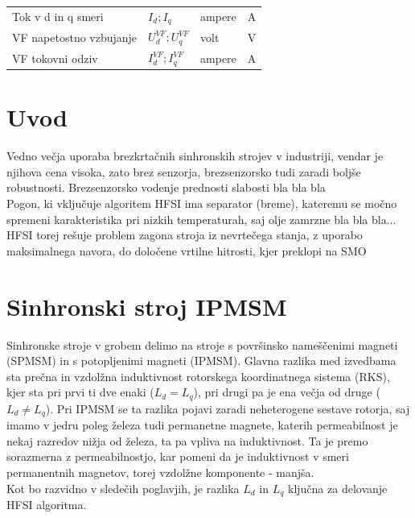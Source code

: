 \documentclass[a4paper,twoside,openright,12pt,slovene]{book}
\begin{document}
\begin{center}
\begin{tabular}{*{4}{l}}
        Tok v d in q smeri                                         & $I_{d}; I_{q}$                         & ampere               & A                      \\
        VF napetostno vzbujanje                                    & $U^{VF}_{d}; U^{VF}_{q}$               & volt                 & V                      \\
        VF tokovni odziv                                           & $I^{VF}_{d}; I^{VF}_{q}$               & ampere               & A                      \\
    \end{tabular}
\end{center}

\mainmatter

\chapter{Uvod} \label{uvod}

Vedno večja uporaba brezkrtačnih sinhronskih strojev v industriji, vendar je njihova cena visoka, zato brez senzorja, brezsenzorsko tudi zaradi boljše robustnosti. Brezsenzorsko vodenje prednosti slabosti bla bla bla \\
Pogon, ki vključuje algoritem HFSI ima separator (breme), kateremu se močno spremeni karakteristika pri nizkih temperaturah, saj olje zamrzne bla bla bla... \\
HFSI torej rešuje problem zagona stroja iz nevrtečega stanja, z uporabo maksimalnega navora, do določene vrtilne hitrosti, kjer preklopi na SMO


\chapter{Sinhronski stroj IPMSM} \label{sinhronskiStroj}

Sinhronske stroje v grobem delimo na stroje s površinsko nameščenimi magneti (SPMSM) in s potopljenimi magneti (IPMSM). Glavna razlika med izvedbama sta prečna in vzdolžna induktivnost rotorskega
koordinatnega sistema (RKS), kjer sta pri prvi ti dve enaki ($L_d = L_q$), pri drugi pa je ena večja od druge ($L_d \neq L_q$). Pri IPMSM se ta razlika pojavi zaradi neheterogene sestave rotorja, saj
imamo v jedru poleg železa tudi permanetne magnete, katerih permeabilnost je nekaj razredov nižja od železa, ta pa vpliva na induktivnost. Ta je premo sorazmerna z permeabilnostjo, kar pomeni da je
induktivnost v smeri permanentnih magnetov, torej vzdolžne komponente - manjša. \\
Kot bo razvidno v sledečih poglavjih, je razlika $L_d$ in $L_q$ ključna za delovanje HFSI algoritma. 
\end{document}
